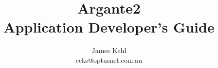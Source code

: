 \documentclass[a4paper,draft,oneside,openany]{book}
\title{\Huge{Argante2}\\\huge{Application Developer's Guide}}
\author{
	\LARGE{James Kehl}\\
	ecks@optusnet.com.au
}
\begin{document}
\maketitle{}


\end{document}
